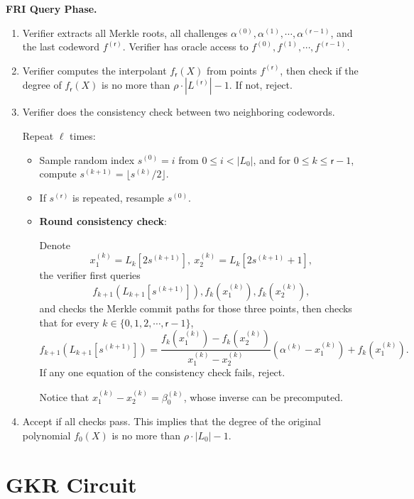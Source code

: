 \noindent\textbf{FRI Query Phase.}
\begin{enumerate}
	\item Verifier extracts all Merkle roots, all challenges $\alpha^{(0)}, \alpha^{(1)}, \cdots ,\alpha^{(\mathsf{r} -1)}$, and the last codeword $f^{(\mathsf{r})}$. Verifier has oracle access to $f^{(0)},f^{(1)}, \cdots, f^{(\mathsf{r} -1)} $.
	
	\item Verifier computes the interpolant $f_{\mathsf{r}}(X)$ from points $f^{(\mathsf{r})}$, then check if the degree of $f_{\mathsf{r}}(X)$ is no more than $\rho\cdot |L^{(\mathsf{r})}| -1$. If not, reject.
	
	\item Verifier does the consistency check between two neighboring codewords.
	
	Repeat $\ell$ times:
	\begin{itemize}
		\item Sample random index $s^{(0)} = i$ from $0\le i < |L_0| $, and for $0\le k \le\mathsf{r} - 1$, compute $s^{(k+1)} = \lfloor s^{(k)}/ 2 \rfloor$. 
		\item If $s^{(\mathsf{r})}$ is repeated, resample $s^{(0)}$.
		
		\item \textbf{Round consistency check}:
		
		Denote
		\[x_1^{(k)} = L_{k}[2s^{(k+1)}],\ x_2^{(k)} = L_{k}[2s^{(k+1)}+1],\] 
		the verifier first queries
		\[f_{k+1}(L_{k+1}[s^{(k+1)}]), f_{k}(x_1^{(k)}), f_{k}(x_2^{(k)}),\]
		and checks the Merkle commit paths for those three points, then 
		checks that for every $k\in \{0,1,2,\cdots, \mathsf{r} - 1\}$,
		\begin{equation}
			f_{k+1}(L_{k+1}[s^{(k+1)}]) =\frac{f_{k}(x_1^{(k)}) - f_{k}(x_2^{(k)})}{x_1^{(k)} - x_2^{(k)}} (\alpha^{(k)} - x_1^{(k)}) + f_{k}(x_1^{(k)}).
		\end{equation}
		If any one equation of the consistency check fails, reject.
		
		Notice that $x_1^{(k)} - x_2^{(k)} = \beta_0^{(k)}$, whose inverse can be precomputed.
	\end{itemize}
	\item Accept if all checks pass. This implies that the degree of the original polynomial $f_0(X)$ is no more than $\rho\cdot |L_0| - 1$.
\end{enumerate}

\section{GKR Circuit}
\label{sec:GKR-implementation}

